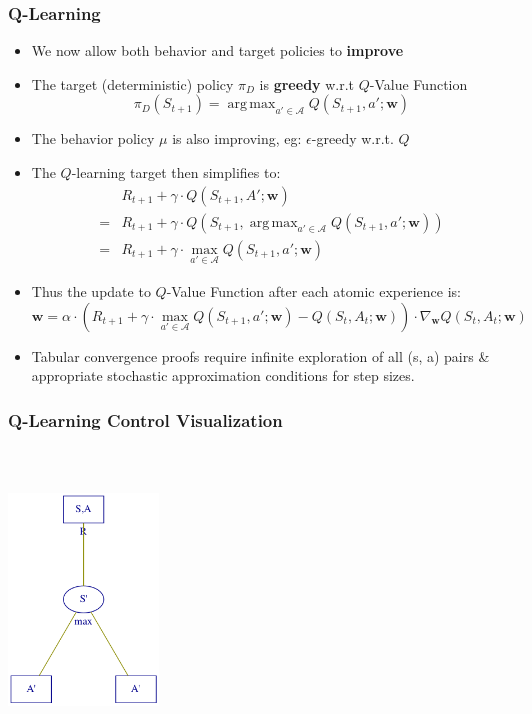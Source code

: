 \documentclass[handout]{beamer}
\DeclareMathOperator*{\argmax}{arg\,max}
\begin{document}
\begin{frame}
\frametitle{Q-Learning}
\pause
\begin{itemize}[<+->]
\item We now allow both behavior and target policies to {\bf improve}
\item The target (deterministic) policy $\pi_D$ is {\bf greedy} w.r.t $Q$-Value Function
$$\pi_D(S_{t+1}) = \argmax_{a' \in \mathcal{A}} Q(S_{t+1}, a'; \bm{w})$$
\item The behavior policy $\mu$ is also improving, eg: $\epsilon$-greedy w.r.t. $Q$
\item The $Q$-learning target then simplifies to:
\begin{align*}
& R_{t+1} + \gamma \cdot Q(S_{t+1}, A'; \bm{w}) \\
= & R_{t+1} + \gamma \cdot Q(S_{t+1}, \argmax_{a' \in \mathcal{A}} Q(S_{t+1}, a'; \bm{w})) \\
= & R_{t+1} + \gamma \cdot \max_{a' \in \mathcal{A}} Q(S_{t+1}, a'; \bm{w})
\end{align*}
\item Thus the update to $Q$-Value Function after each atomic experience is:
$$\bm{w} = \alpha \cdot (R_{t+1} + \gamma \cdot \max_{a' \in \mathcal{A}} Q(S_{t+1}, a'; \bm{w}) - Q(S_t, A_t; \bm{w})) \cdot \nabla_{\bm{w}} Q(S_t,A_t; \bm{w})$$
\item Tabular convergence proofs require infinite exploration of all (s, a) pairs \& appropriate stochastic approximation conditions for step sizes.
\end{itemize}
\end{frame}


\begin{frame}
\frametitle{Q-Learning Control Visualization}
\centerline{\includegraphics[width=4cm, height=8cm]{q_learning.png}}
\end{frame}
\end{document}
